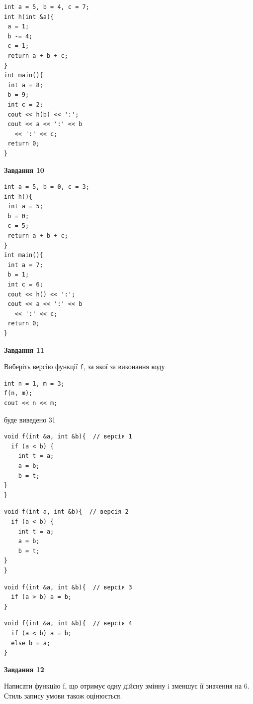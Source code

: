 \documentclass[12pt, ukrainian]{article}
\def\code#1{\Verb!#1!}
\begin{document}
{\begin {large}
\begin{minipage}[t]{7.0cm}
\begin{verbatim}
int a = 5, b = 4, c = 7;
int h(int &a){
 a = 1;
 b -= 4;
 c = 1;
 return a + b + c;
}
int main(){
 int a = 8;
 b = 9;
 int c = 2;
 cout << h(b) << ':';
 cout << a << ':' << b 
   << ':' << c;
 return 0;
}
\end{verbatim}



\begin{center}
\textbf{Завдання 10}
\end{center}
\vspace{-8mm}

\begin{verbatim}
int a = 5, b = 0, c = 3;
int h(){
 int a = 5;
 b = 0;
 c = 5;
 return a + b + c;
}
int main(){
 int a = 7;
 b = 1;
 int c = 6;
 cout << h() << ':';
 cout << a << ':' << b 
   << ':' << c;
 return 0;
}
\end{verbatim}

\end{minipage}
\vline \hspace{1mm}
\begin{minipage}[t]{11.0cm}

\begin{center}
\textbf{Завдання 11}
\end{center}
Виберіть версію функції \code{f}, за якої за виконання коду
\begin{verbatim}
int n = 1, m = 3;
f(n, m);
cout << n << m;
\end{verbatim}

буде виведено 31

\begin{verbatim}
void f(int &a, int &b){  // версія 1
  if (a < b) {
    int t = a;
    a = b;
    b = t;
}  
}
\end{verbatim}

\vspace{-8mm}\begin{verbatim}
void f(int a, int &b){  // версія 2
  if (a < b) {
    int t = a;
    a = b;
    b = t;
}  
}
\end{verbatim}

\vspace{-8mm}\begin{verbatim}
void f(int &a, int &b){  // версія 3
  if (a > b) a = b;
}
\end{verbatim}

\vspace{-8mm}\begin{verbatim}
void f(int &a, int &b){  // версія 4
  if (a < b) a = b;
  else b = a;
}
\end{verbatim}



\begin{center}
\textbf{Завдання 12}
\end{center}

Написати функцiю f, що отримує одну дiйсну змінну i зменшує її значення на 6. Стиль запису умови також оцінюється.\par

\end{minipage}

\end {large}}
\newpage
\end{document}
